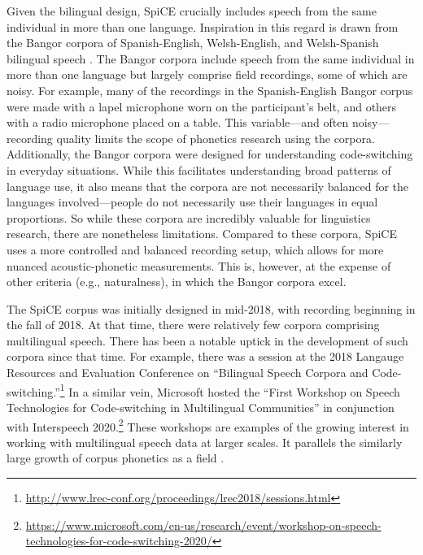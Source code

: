 Given the bilingual design, SpiCE crucially includes speech from the same individual in more than one language. Inspiration in this regard is drawn from the Bangor corpora of Spanish-English, Welsh-English, and Welsh-Spanish bilingual speech \citep{deuchar_2014_corpora}. The Bangor corpora include speech from the same individual in more than one language but largely comprise field recordings, some of which are noisy. For example, many of the recordings in the Spanish-English Bangor corpus were made with a lapel microphone worn on the participant's belt, and others with a radio microphone placed on a table. This variable---and often noisy---recording quality limits the scope of phonetics research using the corpora. Additionally, the Bangor corpora were designed for understanding code-switching in everyday situations. While this facilitates understanding broad patterns of language use, it also means that the corpora are not necessarily balanced for the languages involved---people do not necessarily use their languages in equal proportions. So while these corpora are incredibly valuable for linguistics research, there are nonetheless limitations. Compared to these corpora, SpiCE uses a more controlled and balanced recording setup, which allows for more nuanced acoustic-phonetic measurements. This is, however, at the expense of other criteria (e.g., naturalness), in which the Bangor corpora excel.

The SpiCE corpus was initially designed in mid-2018, with recording beginning in the fall of 2018. At that time, there were relatively few corpora comprising multilingual speech. There has been a notable uptick in the development of such corpora since that time. For example, there was a session at the 2018 Langauge Resources and Evaluation Conference on ``Bilingual Speech Corpora and Code-switching.''\footnote{\url{http://www.lrec-conf.org/proceedings/lrec2018/sessions.html}} In a similar vein, Microsoft hosted the ``First Workshop on Speech Technologies for Code-switching in Multilingual Communities'' in conjunction with Interspeech 2020.\footnote{\url{https://www.microsoft.com/en-us/research/event/workshop-on-speech-technologies-for-code-switching-2020/}} These workshops are examples of the growing interest in working with multilingual speech data at larger scales. It parallels the similarly large growth of corpus phonetics as a field \citep{liberman_2019_corpus,grieve_2021_observation}.

